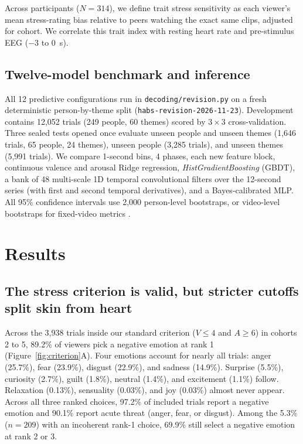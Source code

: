 \documentclass[10pt]{article}
\begin{document}
Across participants ($N = 314$), we define trait stress sensitivity as each viewer's mean stress-rating bias relative to peers watching the exact same clips, adjusted for cohort. We correlate this trait index with resting heart rate and pre-stimulus EEG ($-3$ to $0$~s).

\subsection{Twelve-model benchmark and inference}

All 12 predictive configurations run in \texttt{decoding/\allowbreak revision.py} on a fresh deterministic person-by-theme split (\texttt{habs-revision-2026-11-23}). Development contains 12,052 trials (249 people, 60 themes) scored by $3 \times 3$ cross-validation. Three sealed tests opened once evaluate unseen people and unseen themes (1,646 trials, 65 people, 24 themes), unseen people (3,285 trials), and unseen themes (5,991 trials). We compare 1-second bins, 4 phases, each new feature block, continuous valence and arousal Ridge regression, \emph{HistGradientBoosting} (GBDT), a bank of 48 multi-scale 1D temporal convolutional filters over the 12-second series (with first and second temporal derivatives), and a Bayes-calibrated MLP. All 95\% confidence intervals use 2,000 person-level bootstraps, or video-level bootstraps for fixed-video metrics \cite{varoquaux2018}.

\section{Results}

\subsection{The stress criterion is valid, but stricter cutoffs split skin from heart}

Across the 3,938 trials inside our standard criterion ($V \le 4$ and $A \ge 6$) in cohorts 2 to 5, 89.2\% of viewers pick a negative emotion at rank 1 (Figure~\ref{fig:criterion}A). Four emotions account for nearly all trials: anger (25.7\%), fear (23.9\%), disgust (22.9\%), and sadness (14.9\%). Surprise (5.5\%), curiosity (2.7\%), guilt (1.8\%), neutral (1.4\%), and excitement (1.1\%) follow. Relaxation (0.13\%), sensuality (0.03\%), and joy (0.03\%) almost never appear. Across all three ranked choices, 97.2\% of included trials report a negative emotion and 90.1\% report acute threat (anger, fear, or disgust). Among the 5.3\% ($n = 209$) with an incoherent rank-1 choice, 69.9\% still select a negative emotion at rank 2 or 3.
\end{document}
